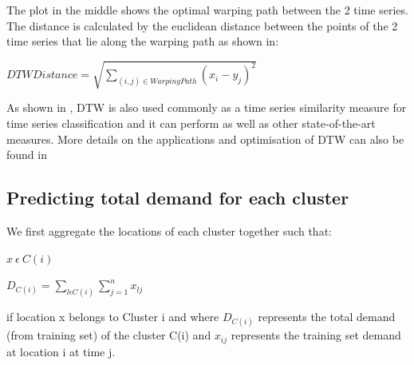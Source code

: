\documentclass[nonblindrev,msom]{informs3} %
\begin{document}
\noindent The plot in the middle shows the optimal warping path between the 2 time series. The distance is calculated by the euclidean distance between the points of the 2 time series that lie along the warping path as shown in:

\begin{center}
$DTW Distance = \sqrt{\sum_{(i,j)\in {Warping Path}}(x_i - y_j)^2}$
\end{center}

\noindent As shown in \cite{Hui2008}, DTW is also used commonly as a time series similarity measure for time series classification and it can perform as well as other state-of-the-art measures. More details on the applications and optimisation of DTW can also be found in \cite{Pavel2008}  
\newpage 

\subsection{Predicting total demand for each cluster}

\noindent We first aggregate the locations of each cluster together such that:

\begin{center}
$x\:\epsilon \: C(i)$
\end{center}

\begin{center}
$D_{C(i)} ={\sum_{l\epsilon C(i)}\sum_{j=1}^{n}x_{lj}}$ 
\end{center}

\noindent if location x belongs to Cluster i and where $D_{C(i)}$ represents the total demand (from training set) of the cluster C(i) and $x_{ij}$ represents the training set demand at location i at time j. 
\end{document}
